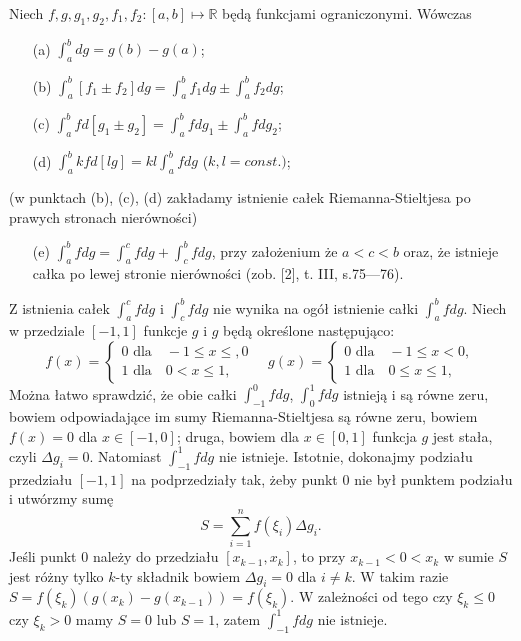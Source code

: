 \documentclass[leqno]{article}
\begin{document}
\begin{justify}
\begin{theorem}
{
    Niech $f,g,g_1,g_2,f_1,f_2 : [a,b] \mapsto \mathbb{R}$ będą funkcjami ograniczonymi. Wówczas
    \begin{itemize}
        \item [(a)]
            $\int_{a}^{b}dg = g(b) - g(a)$;
        \item [(b)]
            $\int_{a}^{b}[f_1 \pm f_2]dg = \int_{a}^{b}f_1dg \pm \int_{a}^{b}f_2dg$;
        \item [(c)]
            $\int_{a}^{b}fd[g_1 \pm g_2] = \int_{a}^{b}fdg_1 \pm \int_{a}^{b}fdg_2$;
        \item [(d)]
            $\int_{a}^{b}kfd[lg] = kl\int_{a}^{b}fdg$ ($k,l = const.)$;
    \end{itemize}
    (w punktach (b), (c), (d) zakładamy istnienie całek Riemanna-Stieltjesa po prawych stronach nierówności)
    \begin{itemize}
        \item [(e)]
            $\int_{a}^{b}fdg = \int_{a}^{c}fdg + \int_{c}^{b}fdg$, przy założenium że $a < c < b$ oraz, że istnieje całka po lewej stronie
            nierówności (zob. [2], t. III, s.75---76).
    \end{itemize}
}
\end{theorem}

\begin{ex}
    Z istnienia całek $\int_{a}^{c}fdg$ i $\int_{c}^{b}fdg$ nie wynika na ogół istnienie całki $\int_{a}^{b}fdg$.
    Niech w przedziale $[-1, 1]$ funkcje $g$ i $g$ będą określone następująco:
    \[ 
        f(x) = 
        \begin{cases}
            0 \text{ dla} \quad -1 \leqslant x \leqslant, 0 \\
            1 \text{ dla} \quad 0 < x \leqslant 1,
        \end{cases}
    \quad 
        g(x) = 
        \begin{cases}
            0 \text{ dla} \quad -1 \leqslant x < 0, \\
            1 \text{ dla} \quad 0 \leqslant x \leqslant 1,
        \end{cases}
    \]
    Można łatwo sprawdzić, że obie całki $\int_{-1}^{0}fdg$, $\int_{0}^{1}fdg$ istnieją i są równe zeru, bowiem
    odpowiadające im sumy Riemanna-Stieltjesa są równe zeru, bowiem $f(x) = 0$ dla $x \in [-1, 0]$; druga, bowiem dla $x \in [0,1]$ funkcja
    $g$ jest stała, czyli $\Delta g_i = 0$. Natomiast $\int_{-1}^{1}fdg$ nie istnieje. Istotnie, dokonajmy podziału przedziału
    $[-1, 1]$ na podprzedziały tak, żeby punkt $0$ nie był punktem podziału i utwórzmy sumę
    \[
        S = \sum_{i=1}^{n}f(\xi_i)\Delta g_i.
    \]
    Jeśli punkt $0$ należy do przedziału $[x_{k-1}, x_k]$, to przy $x_{k-1} < 0 < x_k$ w sumie $S$ jest
    różny tylko $k$-ty składnik bowiem $\Delta g_i = 0$ dla $i \neq k$. W takim razie $S = f(\xi_k)(g(x_k) - g(x_{k-1})) = f(\xi_k)$.
    W zależności od tego czy $\xi_k \leqslant 0$ czy $\xi_k > 0$ mamy $S = 0$ lub $S = 1$, 
    zatem $\int_{-1}^{1}fdg$ nie istnieje.
\end{ex}


\end{justify}
\end{document}
